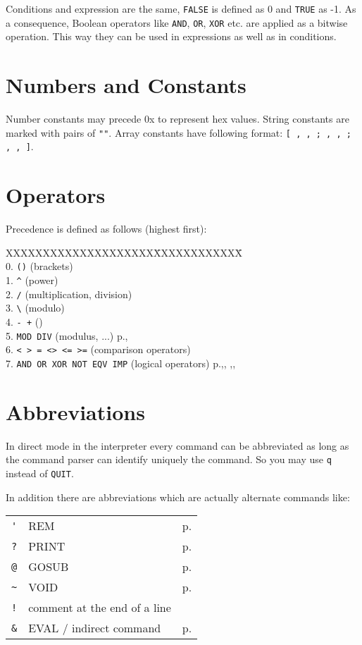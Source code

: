 Conditions and expression are the same, \verb|FALSE| is defined as 0 and
\verb|TRUE| as -1. As a consequence, Boolean operators like \verb|AND|, 
\verb|OR|, \verb|XOR| etc. are applied as a bitwise operation. This way they can
be used in expressions as well as in conditions.

\section{Numbers and Constants}

Number constants may precede 0x to represent hex values. String constants are
marked with pairs of \verb|""|. Array constants have following format: 
\verb|[ , , ; , , ; , , ]|.


\section{Operators}
Precedence is defined as follows (highest first):
\begin{tabbing}
XXXXXXXXXXXXXXXXXXXX\=XXXXXXXXXXXX\=\kill\\
0. {\tt ()}      \>(brackets)\\
1. {\tt \verb|^|}      \>(power) \\
2. {\tt * /}     \>(multiplication, division) \\
3. \verb|\| \> (modulo) \\
4. \verb|- +|           \>    ()\\
5. \verb|MOD DIV|        \>    (modulus, ...)\> p.\pageref{MOD},\pageref{DIV}\\
6. \verb|< > = <> <= >=|  \>    (comparison operators)\\
7. \verb|AND OR XOR NOT EQV IMP| \>(logical operators)\> p.\pageref{AND},\pageref{OR},
\pageref{NOT},\pageref{EQV},\pageref{IMP}\\
 \end{tabbing}

\section{Abbreviations}

In direct mode in the interpreter every command can be abbreviated as long as 
the command parser can identify uniquely the command. So you may use 
{\tt q} instead of {\tt QUIT}.

In addition there are abbreviations which are actually alternate commands like:

\begin{center}
\begin{tabular}{|lll|}\hline
\verb|'| &  REM & p.\pageref{REMbABBREVpbh}\\
\verb|?| &     PRINT& p.\pageref{PRINT}\\
\verb|@| &     GOSUB& p.\pageref{GOSUBbABBREVpba}\\
\verb|~| &     VOID& p.\pageref{VOIDbABBREVpbt}\\
\verb|!| &  comment at the end of a line & \\
\verb|&| &     EVAL / indirect command& p.\pageref{EVAL}\\
\hline
\end{tabular}
\end{center}


